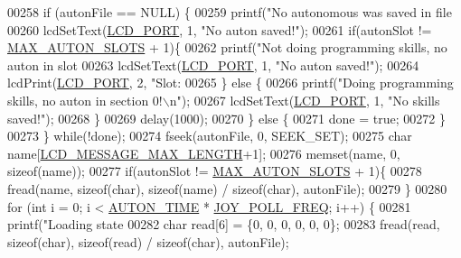 \begin{DoxyCode}
{{{{{{{{{{{{{{{{{{{{{{{{{{{{{{{00258         \textcolor{keywordflow}{if} (autonFile == NULL) \{
00259             printf(\textcolor{stringliteral}{"No autonomous was saved in file %
00260             lcdSetText(\hyperlink{lcdmsg_8h_abcf42bd88b3c36193f301ca25b033875}{LCD\_PORT}, 1, \textcolor{stringliteral}{"No auton saved!"});
00261             \textcolor{keywordflow}{if}(autonSlot != \hyperlink{autonrecorder_8h_a5173a11a545cb4020fdd139552dc15c1}{MAX\_AUTON\_SLOTS} + 1)\{
00262                 printf(\textcolor{stringliteral}{"Not doing programming skills, no auton in slot %
00263                 lcdSetText(\hyperlink{lcdmsg_8h_abcf42bd88b3c36193f301ca25b033875}{LCD\_PORT}, 1, \textcolor{stringliteral}{"No auton saved!"});
00264                 lcdPrint(\hyperlink{lcdmsg_8h_abcf42bd88b3c36193f301ca25b033875}{LCD\_PORT}, 2,   \textcolor{stringliteral}{"Slot: %
00265             \} \textcolor{keywordflow}{else} \{
00266                 printf(\textcolor{stringliteral}{"Doing programming skills, no auton in section 0!\(\backslash\)n"});
00267                 lcdSetText(\hyperlink{lcdmsg_8h_abcf42bd88b3c36193f301ca25b033875}{LCD\_PORT}, 1, \textcolor{stringliteral}{"No skills saved!"});
00268             \}
00269             delay(1000);
00270         \} \textcolor{keywordflow}{else} \{
00271             done = \textcolor{keyword}{true};
00272         \}
00273     \} \textcolor{keywordflow}{while}(!done);
00274     fseek(autonFile, 0, SEEK\_SET);
00275     \textcolor{keywordtype}{char} name[\hyperlink{lcdmsg_8h_abe4c4b70fc6f44ae3680e5b2c68cdd00}{LCD\_MESSAGE\_MAX\_LENGTH}+1];
00276     memset(name, 0, \textcolor{keyword}{sizeof}(name));
00277     \textcolor{keywordflow}{if}(autonSlot != \hyperlink{autonrecorder_8h_a5173a11a545cb4020fdd139552dc15c1}{MAX\_AUTON\_SLOTS} + 1)\{
00278         fread(name, \textcolor{keyword}{sizeof}(\textcolor{keywordtype}{char}), \textcolor{keyword}{sizeof}(name) / \textcolor{keyword}{sizeof}(\textcolor{keywordtype}{char}), autonFile);
00279     \}
00280     \textcolor{keywordflow}{for} (\textcolor{keywordtype}{int} i = 0; i < \hyperlink{autonrecorder_8h_aa19f7c427989a0a67f55958c610d0355}{AUTON\_TIME} * \hyperlink{autonrecorder_8h_a3d2260a30e7ce727bef0402edee4b205}{JOY\_POLL\_FREQ}; i++) \{
00281         printf(\textcolor{stringliteral}{"Loading state %
00282         \textcolor{keywordtype}{char} read[6] = \{0, 0, 0, 0, 0, 0\};
00283         fread(read, \textcolor{keyword}{sizeof}(\textcolor{keywordtype}{char}), \textcolor{keyword}{sizeof}(read) / \textcolor{keyword}{sizeof}(\textcolor{keywordtype}{char}), autonFile);
}}}}}}}}}}}}}}}}}}}}}}}}}}}}}}}}}}}
\end{DoxyCode}
